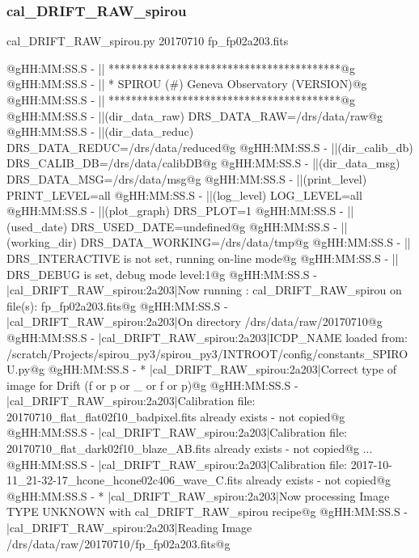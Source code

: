 \subsubsection{cal\_DRIFT\_RAW\_spirou}

\begin{cmdbox}[title={example}]
cal_DRIFT_RAW_spirou.py 20170710 fp_fp02a203.fits
\end{cmdbox}
\begin{cmdboxprintspecial}[fontupper=\tiny, fontlower=\tiny]
@gHH:MM:SS.S -   || *****************************************@g
@gHH:MM:SS.S -   || * SPIROU \@(#) Geneva Observatory (VERSION)@g
@gHH:MM:SS.S -   || *****************************************@g
@gHH:MM:SS.S -   ||(dir_data_raw)      DRS_DATA_RAW=/drs/data/raw@g
@gHH:MM:SS.S -   ||(dir_data_reduc)    DRS_DATA_REDUC=/drs/data/reduced@g
@gHH:MM:SS.S -   ||(dir_calib_db)      DRS_CALIB_DB=/drs/data/calibDB@g
@gHH:MM:SS.S -   ||(dir_data_msg)      DRS_DATA_MSG=/drs/data/msg@g
@gHH:MM:SS.S -   ||(print_level)       PRINT_LEVEL=all         %
@gHH:MM:SS.S -   ||(log_level)         LOG_LEVEL=all         %
@gHH:MM:SS.S -   ||(plot_graph)        DRS_PLOT=1            %
@gHH:MM:SS.S -   ||(used_date)         DRS_USED_DATE=undefined@g
@gHH:MM:SS.S -   ||(working_dir)       DRS_DATA_WORKING=/drs/data/tmp@g
@gHH:MM:SS.S -   ||                    DRS_INTERACTIVE is not set, running on-line mode@g
@gHH:MM:SS.S -   ||                    DRS_DEBUG is set, debug mode level:1@g
@gHH:MM:SS.S -   |cal_DRIFT_RAW_spirou:2a203|Now running : cal_DRIFT_RAW_spirou on file(s): fp_fp02a203.fits@g
@gHH:MM:SS.S -   |cal_DRIFT_RAW_spirou:2a203|On directory /drs/data/raw/20170710@g
@gHH:MM:SS.S -   |cal_DRIFT_RAW_spirou:2a203|ICDP_NAME loaded from: /scratch/Projects/spirou_py3/spirou_py3/INTROOT/config/constants_SPIROU.py@g
@gHH:MM:SS.S - * |cal_DRIFT_RAW_spirou:2a203|Correct type of image for Drift (f or p or _ or f or p)@g
@gHH:MM:SS.S -   |cal_DRIFT_RAW_spirou:2a203|Calibration file: 20170710_flat_flat02f10_badpixel.fits already exists - not copied@g
@gHH:MM:SS.S -   |cal_DRIFT_RAW_spirou:2a203|Calibration file: 20170710_flat_dark02f10_blaze_AB.fits already exists - not copied@g
...
@gHH:MM:SS.S -   |cal_DRIFT_RAW_spirou:2a203|Calibration file: 2017-10-11_21-32-17_hcone_hcone02c406_wave_C.fits already exists - not copied@g
@gHH:MM:SS.S - * |cal_DRIFT_RAW_spirou:2a203|Now processing Image TYPE UNKNOWN with cal_DRIFT_RAW_spirou recipe@g
@gHH:MM:SS.S -   |cal_DRIFT_RAW_spirou:2a203|Reading Image /drs/data/raw/20170710/fp_fp02a203.fits@g

\end{cmdboxprintspecial}
